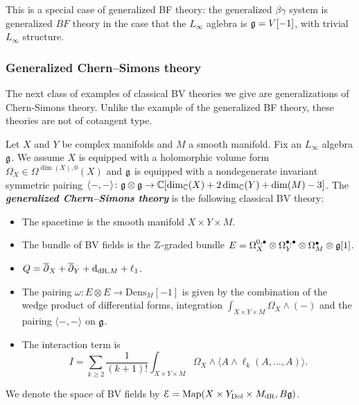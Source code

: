 \documentclass[10pt, oneside]{article}
\newcommand{\Dens}{\mathrm{Dens}}
\newcommand{\defterm}[1]{\textbf{\emph{#1}}}
\begin{document}
\begin{rmk}
This is a special case of generalized BF theory:
the generalized $\beta\gamma$ system is generalized $BF$ theory in the case that the $L_\infty$ aglebra is $\mathfrak g = V[-1]$, with trivial $L_\infty$ structure. 
\end{rmk}

 


\subsubsection{Generalized Chern--Simons theory} \label{gen_CS_section}

The next class of examples of classical BV theories we give are generalizations of Chern-Simons theory. Unlike the example of the generalized BF theory, these theories are not of cotangent type.

\begin{definition}
Let $X$ and $Y$ be complex manifolds and $M$ a smooth manifold. Fix an $L_\infty$ algebra $\mathfrak g$. We assume $X$ is equipped with a holomorphic volume form $\Omega_X \in\Omega^{\dim(X), 0}(X)$ and $\mathfrak g$ is equipped with a nondegenerate invariant symmetric pairing $\langle-, -\rangle\colon \mathfrak g\otimes\mathfrak g\rightarrow \mathbb C[\dim_\mathbb C(X) + 2\dim_\mathbb C(Y) + \dim(M) - 3]$. The \defterm{generalized Chern--Simons theory} is the following classical BV theory:
\begin{itemize}
\item The spacetime is the smooth manifold $X\times Y\times M$.

\item The bundle of BV fields is the $\mathbb Z$-graded bundle $E = \Omega^{0,\bullet}_X \otimes \Omega^{\bullet,\bullet}_Y \otimes \Omega^\bullet_M \otimes \mathfrak g[1]$.

\item $Q = \overline{\partial}_X + \overline{\partial}_Y + {\rm d}_{\mathrm{dR}, M} + \ell_1$.

\item The pairing $\omega\colon E\otimes E\rightarrow \Dens_M[-1]$ is given by the combination of the wedge product of differential forms, integration $\int_{X\times Y\times M} \Omega_X\wedge (-)$ and the pairing $\langle -, -\rangle$ on $\mathfrak g$.

\item The interaction term is
\[I = \sum_{k\geq 2}\frac{1}{(k+1)!} \int_{X\times Y\times M} \Omega_X\wedge \langle A\wedge \ell_k(A, \dots, A)\rangle.\]
\end{itemize}
We denote the space of BV fields by $\mathcal E = \operatorname{Map}(X\times Y_{\mathrm{Dol}}\times M_{\mathrm{dR}}, B \mathfrak g)$.
\label{def:generalizedCS}
\end{definition}
\end{document}
